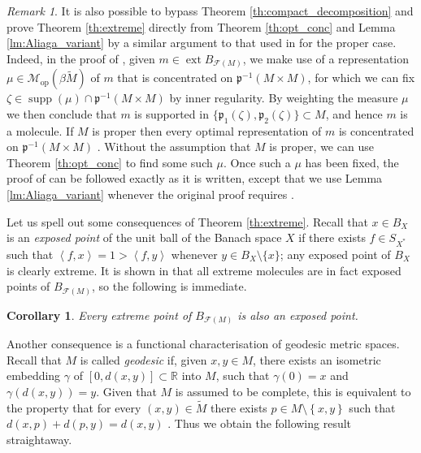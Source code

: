 \documentclass[a4paper,10pt]{amsart}
\DeclareMathOperator{\supp}{supp}                           %
\DeclareMathOperator{\ext}{ext}                             %
\newcommand{\RR}{\mathbb{R}}                                %
\newcommand{\set}[1]{\left\{{#1}\right\}}                   %
\newcommand{\duality}[1]{\left<{#1}\right>}                 %
\newcommand{\lipfree}[1]{\mathcal{F}({#1})}                 %
\newcommand{\wt}[1]{\widetilde{#1}}                         %
\newcommand{\bwt}[1]{\beta\wt{#1}}                          %
\newcommand{\pp}{\mathfrak{p}}                              %
\newcommand{\opr}[1]{\mathcal{M}_{\mathrm{op}}(#1)}         %
\theoremstyle{plain}
\newtheorem{corollary}[theorem]{Corollary}
\theoremstyle{definition}
\theoremstyle{remark}
\newtheorem{remark}[theorem]{Remark}
\begin{document}
\begin{remark}
It is also possible to bypass Theorem \ref{th:compact_decomposition} and prove Theorem \ref{th:extreme} directly from Theorem \ref{th:opt_conc} and Lemma \ref{lm:Aliaga_variant} by a similar argument to that used in \cite{Aliaga} for the proper case. 
Indeed, in the proof of \cite[Theorem 1]{Aliaga}, given $m \in \ext B_{\lipfree{M}}$, we make use of a representation $\mu \in \opr{\bwt{M}}$ of $m$ that is concentrated on $\pp^{-1}(M \times M)$,  for which we can fix $\zeta \in \supp(\mu) \cap \pp^{-1}(M \times M)$ by inner regularity. By weighting the measure $\mu$ we then conclude that $m$ is supported in $\{\pp_1(\zeta),\pp_2(\zeta)\}\subset M$, and hence $m$ is a molecule. If $M$ is proper then every optimal representation of $m$ is concentrated on $\pp^{-1}(M \times M)$ \cite[Proposition 7]{Aliaga}. Without the assumption that $M$ is proper, we can use Theorem \ref{th:opt_conc} to find some such $\mu$. Once such a $\mu$ has been fixed, the proof of \cite[Theorem 1]{Aliaga} can be followed exactly as it is written, except that we use Lemma \ref{lm:Aliaga_variant} whenever the original proof requires \cite[Lemma 11]{Aliaga}.
\end{remark}


Let us spell out some consequences of Theorem \ref{th:extreme}.
Recall that $x \in B_X$ is an \emph{exposed point} of the unit ball of the Banach space $X$ if there exists $f \in S_{X^*}$ such that $\duality{f,x} =1 > \duality{f,y}$ whenever $y \in B_X\setminus\{x\}$; any exposed point of $B_X$ is clearly extreme. It is shown in \cite[Theorem 3.2]{APPP_2020} that all extreme molecules are in fact exposed points of $B_{\lipfree{M}}$, so the following is immediate.

\begin{corollary}\label{cr:exposed}
Every extreme point of $B_{\lipfree{M}}$ is also an exposed point.
\end{corollary}

Another consequence is a functional characterisation of geodesic metric spaces. Recall that $M$ is called \emph{geodesic} if, given $x,y \in M$, there exists an isometric embedding $\gamma$ of $[0,d(x,y)] \subset \RR$ into $M$, such that $\gamma(0)=x$ and $\gamma(d(x,y))=y$. Given that $M$ is assumed to be complete, this is equivalent to the property that for every $(x,y) \in \wt{M}$ there exists $p\in M\setminus\set{x,y}$ such that $d(x,p)+d(p,y)=d(x,y)$ \cite[Proposition 4.1]{GPAZ}. Thus we obtain the following result straightaway.
\end{document}
